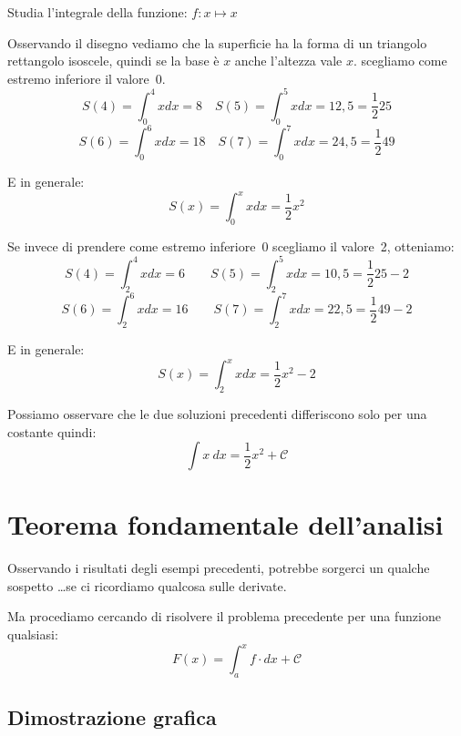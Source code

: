 \begin{esempio}
Studia l'integrale della funzione: \(f: x \mapsto x\)

\begin{minipage}{.59 \textwidth}
Osservando il disegno vediamo che la superficie ha la forma di un triangolo 
rettangolo isoscele, quindi se la base è \(x\) anche l'altezza vale \(x\).
scegliamo come estremo inferiore il valore~0.
\[S(4)=\int_0^4 x dx = 8 \quad 
  S(5)=\int_0^5 x dx = 12,5 = \dfrac{1}{2}25\] 
\[S(6)=\int_0^6 x dx = 18 \quad 
  S(7)=\int_0^7 x dx = 24,5 = \dfrac{1}{2}49\]

E in generale:
\[S(x)=\int_0^x x dx = \dfrac{1}{2}x^2\]
\end{minipage}
\hfill
\begin{minipage}{.39 \textwidth}
\begin{inaccessibleblock}[]  
  \begin{center}  \end{center}
\end{inaccessibleblock}
\end{minipage}

Se invece di prendere come estremo inferiore~0 scegliamo il valore~2, 
otteniamo:
\[S(4)=\int_2^4 x dx = 6 \qquad
  S(5)=\int_2^5 x dx = 10,5 = \dfrac{1}{2}25 -2\] 
\[S(6)=\int_2^6 x dx = 16 \qquad 
  S(7)=\int_2^7 x dx = 22,5 = \dfrac{1}{2}49 -2\]

E in generale:
\[S(x)=\int_2^x x dx = \dfrac{1}{2}x^2 -2\]

Possiamo osservare che le due soluzioni precedenti differiscono solo per una 
costante quindi: 
\[\int x~dx = \dfrac{1}{2}x^2 + \mathcal{C}\]
\end{esempio}

% 

\section{Teorema fondamentale dell'analisi}
\label{sec:integrali_teorema_fondamentale}
Osservando i risultati degli esempi precedenti, potrebbe sorgerci un qualche 
sospetto \dots se ci ricordiamo qualcosa sulle derivate.

Ma procediamo cercando di risolvere il problema precedente per una funzione 
qualsiasi: 
\[F(x) = \int_a^x f \cdot dx + \mathcal{C}\]

\subsection{Dimostrazione grafica}

